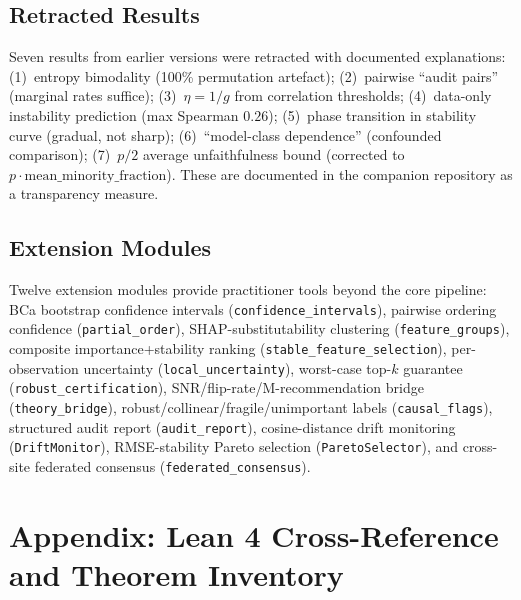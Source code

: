 \documentclass[11pt,a4paper]{article}
\begin{document}
\subsection{Retracted Results}

Seven results from earlier versions were retracted with documented explanations:
(1)~entropy bimodality (100\% permutation artefact);
(2)~pairwise ``audit pairs'' (marginal rates suffice);
(3)~$\eta = 1/g$ from correlation thresholds;
(4)~data-only instability prediction (max Spearman $0.26$);
(5)~phase transition in stability curve (gradual, not sharp);
(6)~``model-class dependence'' (confounded comparison);
(7)~$p/2$ average unfaithfulness bound (corrected to $p \cdot \text{mean\_minority\_fraction}$).
These are documented in the companion repository as a transparency measure.

\subsection{Extension Modules}

Twelve extension modules provide practitioner tools beyond the core pipeline: BCa bootstrap confidence intervals (\texttt{confidence\_intervals}), pairwise ordering confidence (\texttt{partial\_order}), SHAP-substitutability clustering (\texttt{feature\_groups}), composite importance+stability ranking (\texttt{stable\_feature\_selection}), per-observation uncertainty (\texttt{local\_uncertainty}), worst-case top-$k$ guarantee (\texttt{robust\_certification}), SNR/flip-rate/M-recommendation bridge (\texttt{theory\_bridge}), robust/collinear/fragile/unimportant labels (\texttt{causal\_flags}), structured audit report (\texttt{audit\_report}), cosine-distance drift monitoring (\texttt{DriftMonitor}), RMSE-stability Pareto selection (\texttt{ParetoSelector}), and cross-site federated consensus (\texttt{federated\_consensus}).

\newpage
\section*{Appendix: Lean 4 Cross-Reference and Theorem Inventory}



\end{document}
